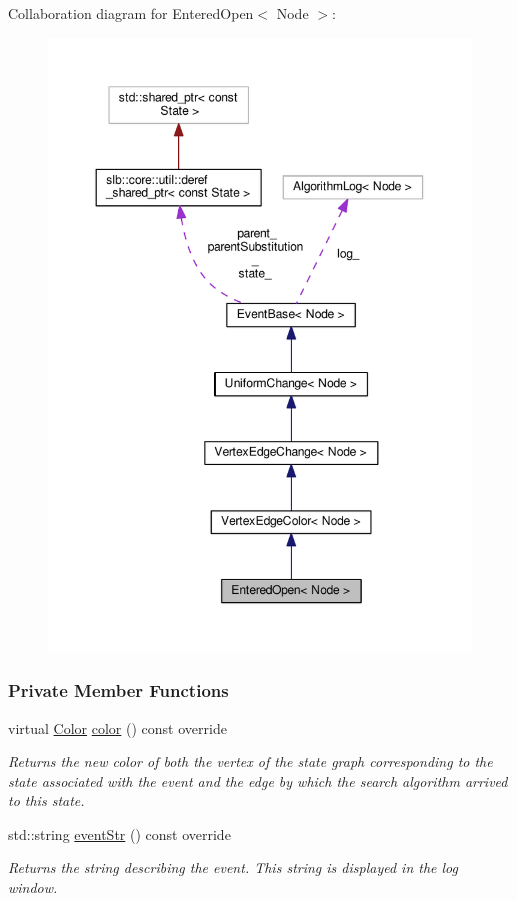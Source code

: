 Collaboration diagram for Entered\+Open$<$ Node $>$\+:\nopagebreak
\begin{figure}[H]
\begin{center}
\leavevmode
\includegraphics[width=350pt]{structEnteredOpen__coll__graph}
\end{center}
\end{figure}
\subsubsection*{Private Member Functions}
\begin{DoxyCompactItemize}
\item 
virtual \hyperlink{colors_8h_ab87bacfdad76e61b9412d7124be44c1c}{Color} \hyperlink{structEnteredOpen_a3a0c0690450e47d69c8125a147918ab3}{color} () const override
\begin{DoxyCompactList}\small\item\em Returns the new color of both the vertex of the state graph corresponding to the state associated with the event and the edge by which the search algorithm arrived to this state. \end{DoxyCompactList}\item 
std\+::string \hyperlink{structEnteredOpen_a8cac16ba4c06b75730fbadde398830df}{event\+Str} () const override
\begin{DoxyCompactList}\small\item\em Returns the string describing the event. This string is displayed in the log window. \end{DoxyCompactList}\end{DoxyCompactItemize}
